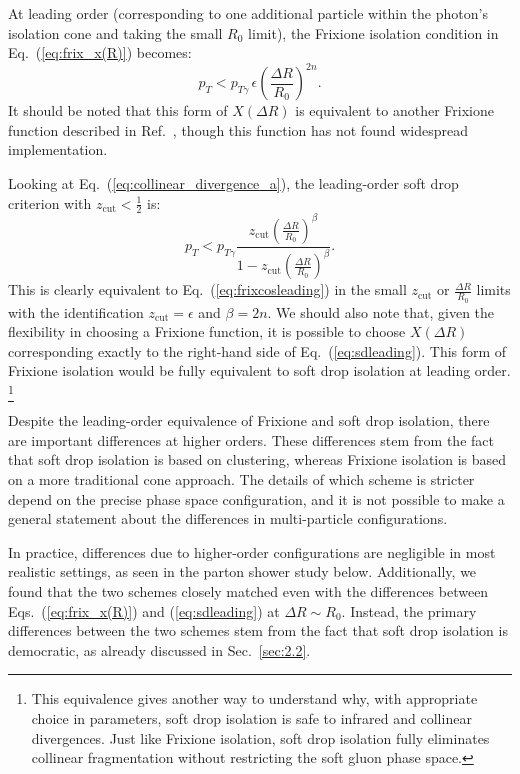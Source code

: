 \documentclass[a4paper,11pt]{article}
\DeclareRobustCommand{\Sec}[1]{Sec.~\ref{#1}}
\DeclareRobustCommand{\Eq}[1]{Eq.~(\ref{#1})}
\DeclareRobustCommand{\Eqs}[2]{Eqs.~(\ref{#1}) and (\ref{#2})}
\DeclareRobustCommand{\Ref}[1]{Ref.~\cite{#1}}
\begin{document}
At leading order (corresponding to one additional particle within the photon's isolation cone and taking the small $R_0$ limit), the Frixione isolation condition in \Eq{eq:frix_x(R)} becomes:
%
\begin{equation}
\label{eq:frixcosleading}
    p_T < p_{T\gamma}\, \epsilon \left(\frac{\Delta R}{R_0}\right)^{2 n}.
\end{equation}
%
It should be noted that this form of $X(\Delta R)$ is equivalent to another Frixione function described in \Ref{Frixione:1998jh}, though this function has not found widespread implementation.


Looking at \Eq{eq:collinear_divergence_a}, the leading-order soft drop criterion with $z_{\text{cut}} < \frac{1}{2}$ is:
%
\begin{equation}
\label{eq:sdleading}
    p_T < p_{T \gamma} \frac{z_{\text{cut}} \left(\frac{\Delta R}{R_0}\right)^{\beta}}{1 - z_{\text{cut}} \left(\frac{\Delta R}{R_0}\right)^{\beta}}.
\end{equation}
%
This is clearly equivalent to \Eq{eq:frixcosleading} in the small $z_{\text{cut}}$ or $\frac{\Delta R}{R_0}$ limits with the identification $z_{\text{cut}} = \epsilon$ and $\beta = 2 n$.
%
We should also note that, given the flexibility in choosing a Frixione function, it is possible to choose $X(\Delta R)$ corresponding exactly to the right-hand side of \Eq{eq:sdleading}.
%
This form of Frixione isolation would be fully equivalent to soft drop isolation at leading order.%
%
\footnote{This equivalence gives another way to understand why, with appropriate choice in parameters, soft drop isolation is safe to infrared and collinear divergences.
%
Just like Frixione isolation, soft drop isolation fully eliminates collinear fragmentation without restricting the soft gluon phase space.
%
}

Despite the leading-order equivalence of Frixione and soft drop isolation, there are important differences at higher orders.
%
These differences stem from the fact that soft drop isolation is based on clustering, whereas Frixione isolation is based on a more traditional cone approach.
%
The details of which scheme is stricter depend on the precise phase space configuration, and it is not possible to make a general statement about the differences in multi-particle configurations.


In practice, differences due to higher-order configurations are negligible in most realistic settings, as seen in the parton shower study below.
%
Additionally, we found that the two schemes closely matched even with the differences between \Eqs{eq:frix_x(R)}{eq:sdleading} at $\Delta R \sim R_0$.
%
Instead, the primary differences between the two schemes stem from the fact that soft drop isolation is democratic, as already discussed in \Sec{sec:2.2}.
\end{document}
